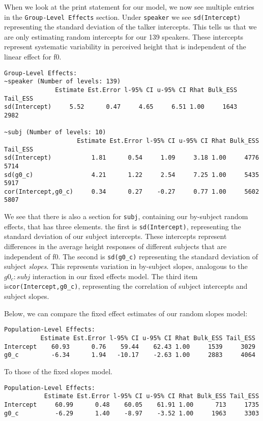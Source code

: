 \documentclass[
]{book}
\begin{document}
When we look at the print statement for our model, we now see multiple entries in the \texttt{Group-Level\ Effects} section. Under \texttt{speaker} we see \texttt{sd(Intercept)} representing the standard deviation of the talker intercepts. This tells us that we are only estimating random intercepts for our 139 speakers. These intercepts represent systematic variability in perceived height that is independent of the linear effect for f0.

\begin{verbatim}
Group-Level Effects: 
~speaker (Number of levels: 139) 
              Estimate Est.Error l-95% CI u-95% CI Rhat Bulk_ESS Tail_ESS
sd(Intercept)     5.52      0.47     4.65     6.51 1.00     1643     2982

~subj (Number of levels: 10) 
                    Estimate Est.Error l-95% CI u-95% CI Rhat Bulk_ESS Tail_ESS
sd(Intercept)           1.81      0.54     1.09     3.18 1.00     4776     5714
sd(g0_c)                4.21      1.22     2.54     7.25 1.00     5435     5917
cor(Intercept,g0_c)     0.34      0.27    -0.27     0.77 1.00     5602     5807
\end{verbatim}

We see that there is also a section for \texttt{subj}, containing our by-subject random effects, that has three elements. the first is \texttt{sd(Intercept)}, representing the standard deviation of our subject intercepts. These intercepts represent differences in the average height responses of different subjects that are independent of f0. The second is \texttt{sd(g0\_c)} representing the standard deviation of subject \emph{slopes}. This represents variation in by-subject slopes, analogous to the \(g0_c \colon subj\) interaction in our fixed effects model. The third item is\texttt{cor(Intercept,g0\_c)}, representing the correlation of subject intercepts and subject slopes.

Below, we can compare the fixed effect estimates of our random slopes model:

\begin{verbatim}
Population-Level Effects: 
          Estimate Est.Error l-95% CI u-95% CI Rhat Bulk_ESS Tail_ESS
Intercept    60.93      0.76    59.44    62.43 1.00     1539     3029
g0_c         -6.34      1.94   -10.17    -2.63 1.00     2883     4064
\end{verbatim}

To those of the fixed slopes model.

\begin{verbatim}
Population-Level Effects: 
           Estimate Est.Error l-95% CI u-95% CI Rhat Bulk_ESS Tail_ESS
Intercept     60.99      0.48    60.05    61.91 1.00      713     1735
g0_c          -6.29      1.40    -8.97    -3.52 1.00     1963     3303
\end{verbatim}
\end{document}
